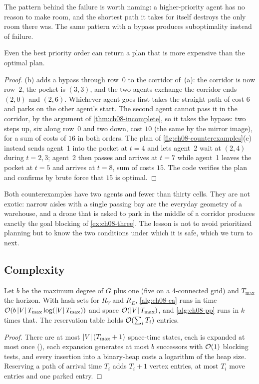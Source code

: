 The pattern behind the failure is worth naming: a higher-priority agent has no reason
to make room, and the shortest path it takes for itself destroys the only room there
was. The same pattern with a bypass produces suboptimality instead of failure.

\begin{proposition}[Suboptimality]
\label{thm:ch08-suboptimal}
Even the best priority order can return a plan that is more expensive than the optimal
plan.
\end{proposition}
\begin{proof}
(b) adds a bypass through row~$0$ to the corridor
of~(a): the corridor is now row~$2$, the pocket is $(3,3)$, and the two agents exchange
the corridor ends $(2,0)$ and $(2,6)$. Whichever agent goes first takes the straight
path of cost $6$ and parks on the other agent's start. The second agent cannot pass it
in the corridor, by the argument of \cref{thm:ch08-incomplete}, so it takes the
bypass: two steps up, six along row~$0$ and two down, cost $10$ (the same by the
mirror image), for a sum of costs of $16$ in both orders. The plan of
\cref{fig:ch08-counterexamples}(c) instead sends agent~1 into the pocket at $t = 4$ and
lets agent~2 wait at $(2,4)$ during $t = 2, 3$; agent~2 then passes and arrives at
$t = 7$ while agent~1 leaves the pocket at $t = 5$ and arrives at $t = 8$, sum of costs
$15$. The code verifies the plan and confirms by brute force that $15$ is optimal.
\qedhere
\end{proof}

Both counterexamples have two agents and fewer than thirty cells. They are not exotic:
narrow aisles with a single passing bay are the everyday geometry of a warehouse, and
a drone that is asked to park in the middle of a corridor produces exactly the goal
blocking of \cref{ex:ch08-three}. The lesson is not to avoid prioritized planning but
to know the two conditions under which it is safe, which we turn to next.

\subsection{Complexity}

\begin{proposition}[Complexity]
\label{thm:ch08-complexity}
Let $b$ be the maximum degree of $G$ plus one (five on a 4-connected grid) and
$T_{\max}$ the horizon. With hash sets for $R_V$ and $R_E$, \cref{alg:ch08-ca}
runs in time $\mathcal{O}\!\left(b \left\lvert V \right\rvert T_{\max} \log(\left\lvert V \right\rvert T_{\max})\right)$ and space
$\mathcal{O}\!\left(\left\lvert V \right\rvert T_{\max}\right)$, and \cref{alg:ch08-pp} runs in $k$ times that. The
reservation table holds $\mathcal{O}\!\left(\sum_i T_i\right)$ entries.
\end{proposition}
\begin{proof}
There are at most $\left\lvert V \right\rvert(T_{\max} + 1)$ space-time states, each is expanded at most
once (\Closed), each expansion generates at most $b$ successors with $\mathcal{O}\!\left(1\right)$
blocking tests, and every insertion into a binary-heap \Open costs a logarithm of the
heap size. Reserving a path of arrival time $T_i$ adds $T_i + 1$ vertex entries, at
most $T_i$ move entries and one parked entry.
\end{proof}

